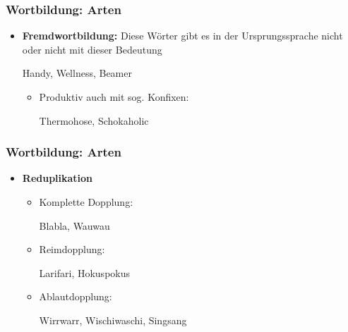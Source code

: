 \begin{frame}
\frametitle{Wortbildung: Arten}

\begin{itemize}
\item \textbf{Fremdwortbildung:} Diese Wörter gibt es in der Ursprungssprache nicht oder nicht mit dieser Bedeutung

\ea Handy, Wellness, Beamer
\z

\begin{itemize}
\item Produktiv auch mit sog. Konfixen:

\ea Thermohose, Schokaholic
\z

\end{itemize}

\end{itemize}


\end{frame}


\begin{frame}
\frametitle{Wortbildung: Arten}

\begin{itemize}
\item \textbf{Reduplikation}

\begin{itemize}
\item Komplette Dopplung:

\ea Blabla, Wauwau
\z

\item Reimdopplung:

\ea Larifari, Hokuspokus
\z

\item Ablautdopplung:

\ea Wirrwarr, Wischiwaschi, Singsang
\z

\end{itemize}

\end{itemize}

\end{frame}


